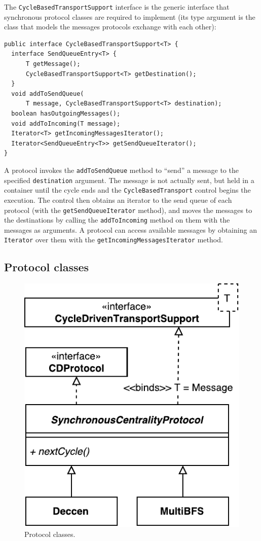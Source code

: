 The \texttt{CycleBasedTransportSupport} interface is the generic interface that syn\-chro\-nous protocol classes are required to implement (its type argument is the class that models the messages protocols exchange with each other):
\begin{verbatim}
public interface CycleBasedTransportSupport<T> {
  interface SendQueueEntry<T> {
      T getMessage();
      CycleBasedTransportSupport<T> getDestination();
  }
  void addToSendQueue(
      T message, CycleBasedTransportSupport<T> destination);
  boolean hasOutgoingMessages();
  void addToIncoming(T message);
  Iterator<T> getIncomingMessagesIterator();
  Iterator<SendQueueEntry<T>> getSendQueueIterator();
}
\end{verbatim}
A protocol invokes the \texttt{addToSendQueue} method to ``send'' a message to the specified \texttt{destination} argument. The message is not actually sent, but held in a container until the cycle ends and the \texttt{CycleBasedTransport} control begins the execution. The control then obtains an iterator to the send queue of each protocol (with the \texttt{getSendQueueIterator} method), and moves the messages to the destinations by calling the \texttt{addToIncoming} method on them with the messages as arguments. A protocol can access available messages by obtaining an \texttt{Iterator} over them with the \texttt{getIncomingMessagesIterator} method.

\subsection{Protocol classes}

\begin{figure}
\centering
\includegraphics[height=0.31\textheight]{diagram_final.pdf}
\caption{Protocol classes.}
\label{class:protocol:hierarchy}
\end{figure}

